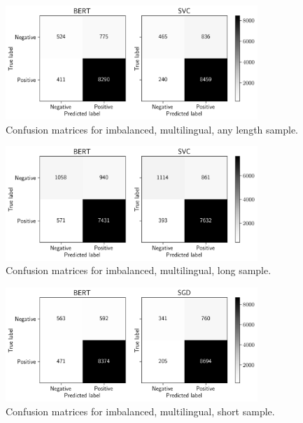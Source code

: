 \begin{figure}[!htb]
    \centering
    \includegraphics[width=0.85\textwidth]{figures/06_results/01_rfp/01_pol/01_cm/any_any_any.png}
    \caption{Confusion matrices for imbalanced, multilingual, any length sample.}
    \label{fig:A1_CM_IMA}
\end{figure}

\begin{figure}[!htb]
    \centering
    \includegraphics[width=0.85\textwidth]{figures/06_results/01_rfp/01_pol/01_cm/any_any_long.png}
    \caption{Confusion matrices for imbalanced, multilingual, long sample.}
    \label{fig:A1_CM_IML}
\end{figure}

\begin{figure}[!htb]
    \centering
    \includegraphics[width=0.85\textwidth]{figures/06_results/01_rfp/01_pol/01_cm/any_any_short.png}
    \caption{Confusion matrices for imbalanced, multilingual, short sample.}
    \label{fig:A1_CM_IMS}
\end{figure}

